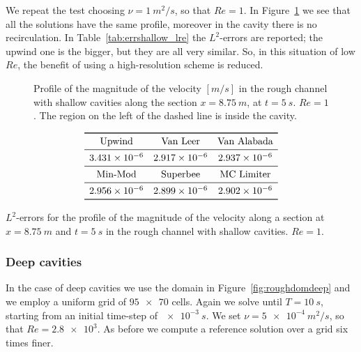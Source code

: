 We repeat the test choosing $\nu=\SI{1}{m^2/s}$, so that $Re=1$. In 
Figure~\ref{fig:linecompshallowlre} we see that all the solutions have the same 
profile, moreover in the cavity there is no recirculation. In 
Table~\ref{tab:errshallow_lre} the $L^2$-errors are reported; the upwind one is 
the bigger, but they are all very similar. So, in this situation of low $Re$, 
the benefit of using a high-resolution scheme is reduced.
\begin{figure}
	\centering
	
	\caption[Profile of the magnitude of the velocity in the rough channel with 
	shallow cavities at $Re=1$]{Profile of the magnitude of the velocity 
	$[\si{m/s}]$ in the rough channel with shallow cavities along the section 
	$x=\SI{8.75}{m}$, at $t=\SI{5}{s}$. $Re=1$. The region on the left of the 
	dashed line is inside the cavity.}
	\label{fig:linecompshallowlre}
\end{figure}
\begin{table}
	\centering
	\[
	\begin{array}{ccc}
	\toprule
	\text{Upwind} & \text{Van Leer} & \text{Van Alabada}\\
	\midrule
	\num{3.431e-6} & \num{2.917e-6} & \num{2.937e-6}\\
	\midrule
	\text{Min-Mod} & \text{Superbee} & \text{MC Limiter} \\ 
	\midrule
	\num{2.956e-6} & \num{2.899e-6} & \num{2.902e-6}\\
	\bottomrule
	\end{array}
	\]
	\caption[$L^2$-errors for the profile of the magnitude of the velocity in 
	the rough channel with shallow cavities at $Re=1$]{$L^2$-errors for the 
	profile of the magnitude of the velocity along a section at 
	$x=\SI{8.75}{m}$ and $t=\SI{5}{s}$ in the rough channel with shallow 
	cavities. $Re = 1$.}
	\label{tab:errshallow_lre}
\end{table}
%
\subsubsection{Deep cavities}
In the case of deep cavities we use the domain in Figure~\ref{fig:roughdomdeep} 
and we employ a uniform grid of $\num{95x70}$ cells. Again we solve until 
$T=\SI{10}{s}$, starting from an initial time-step of $\SI{e-3}{s}$. We set 
$\nu=\SI{5e-4}{m^2/s}$, so that $Re=\num{2.8e3}$. As before we compute a 
reference solution over a grid six times finer.

